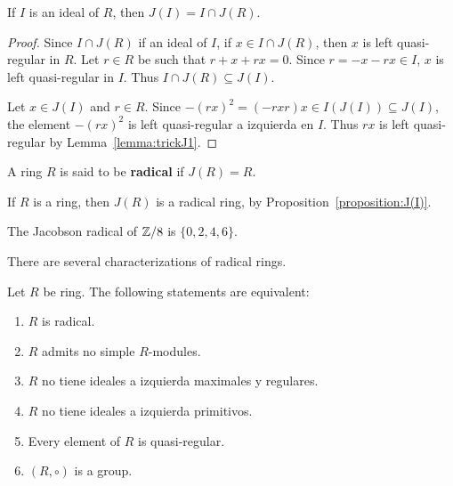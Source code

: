%

\begin{proposition}
	\label{proposition:J(I)}
	If $I$ is an ideal of $R$, then $J(I)=I\cap J(R)$. 
\end{proposition}

\begin{proof}
	Since $I\cap J(R)$ if an ideal of $I$, if $x\in I\cap J(R)$, then $x$ is
	left quasi-regular in $R$. Let $r\in R$ be such that $r+x+rx=0$. 
	Since $r=-x-rx\in I$, $x$ is left quasi-regular 
	in $I$. Thus $I\cap J(R)\subseteq J(I)$. 

	Let $x\in J(I)$ and $r\in R$. Since $-(rx)^2=(-rxr)x\in
	I(J(I))\subseteq J(I)$, the element $-(rx)^2$ is left quasi-regular a izquierda
	en $I$. Thus $rx$ is left quasi-regular by
	Lemma~\ref{lemma:trickJ1}.
\end{proof}

A ring $R$ is said to be \textbf{radical} if $J(R)=R$. 

\begin{example}
	If $R$ is a ring, then $J(R)$ is a radical ring, by Proposition~\ref{proposition:J(I)}.
\end{example}

\begin{example}
	The Jacobson radical of $\mathbb{Z}/8$ is $\{0,2,4,6\}$. 
\end{example}

There are several characterizations of radical rings. 

\begin{theorem}
	\label{theorem:anillo_radical}
	Let $R$ be ring. The following statements are equivalent: 
	\begin{enumerate}
		\item $R$ is radical.
		\item $R$ admits no simple $R$-modules. 
		\item $R$ no tiene ideales a izquierda maximales y regulares.
		\item $R$ no tiene ideales a izquierda primitivos.
		\item Every element of $R$ is quasi-regular. 
		\item $(R,\circ)$ is a group. 
	\end{enumerate}
\end{theorem}

